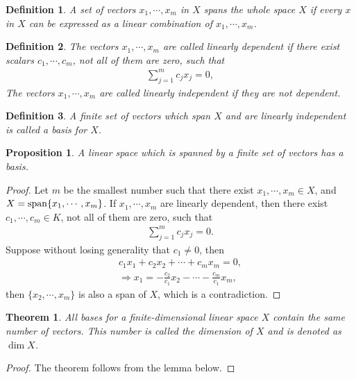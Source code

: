 \documentclass[11pt]{book}
\newtheorem{definition}{Definition}[chapter]
\newtheorem{theorem}{Theorem}[chapter]
\newtheorem{proposition}{Proposition}[chapter]
\theoremstyle{definition}
\numberwithin{equation}{chapter}
\begin{document}
\begin{definition}
A set of vectors $x_1,\cdots, x_m$ in $X$ spans the whole space $X$ if every $x$ in $X$ can be expressed as a linear combination of $x_1,\cdots, x_m$.
\end{definition}

\begin{definition}
The vectors $x_1,\cdots, x_m$ are called linearly dependent if there exist scalars $c_1,\cdots, c_m$, not all of them are zero, such that
\begin{align*}
    \sum^m_{j=1} c_j x_j = 0,
\end{align*}
The vectors $x_1,\cdots, x_m$ are called linearly independent if they are not dependent. 
\end{definition}

\medskip

\begin{definition}
A finite set of vectors which span $X$ and are linearly independent is called a basis for $X$.
\end{definition}

\medskip

\begin{proposition}
A linear space which is spanned by a finite set of vectors has a basis.
\end{proposition}
\begin{proof}
Let $m$ be the smallest number such that there exist $x_1,\cdots,x_m \in X$, and $X = {\rm span}\{x_1,\cdots,x_m\}$. If $x_1,\cdots,x_m$ are linearly dependent, then there exist $c_1,\cdots,c_m\in K$, not all of them are zero, such that
\begin{align*}
    \sum^m_{j=1}c_j x_j = 0.
\end{align*}
Suppose without losing generality that $c_1 \neq 0$, then 
\begin{align*}
    c_1 x_1 + c_2 x_2 + \cdots + c_m x_m = 0,\\
    \Rightarrow x_1 = -\frac{c_2}{c_1}x_2 - \cdots - \frac{c_m}{c_1}x_m,
\end{align*}
then $\{x_2,\cdots,x_m\}$ is also a span of $X$, which is a contradiction.
\end{proof}

\medskip

\begin{theorem}
All bases for a finite-dimensional linear space $X$ contain the
same number of vectors. This number is called the dimension of $X$ and is denoted as $ \dim  X$.
\end{theorem}
\begin{proof}
The theorem follows from the lemma below.
\end{proof}
\end{document}
